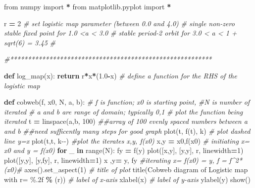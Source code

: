 \documentclass[
  a4paper,
  oneside,
  final]{krantz}
\newenvironment{Shaded}{\begin{snugshade}}{\end{snugshade}}
\newcommand{\BuiltInTok}[1]{#1}
\newcommand{\CommentTok}[1]{\textcolor[rgb]{0.56,0.35,0.01}{\textit{#1}}}
\newcommand{\ControlFlowTok}[1]{\textcolor[rgb]{0.13,0.29,0.53}{\textbf{#1}}}
\newcommand{\DecValTok}[1]{\textcolor[rgb]{0.00,0.00,0.81}{#1}}
\newcommand{\FloatTok}[1]{\textcolor[rgb]{0.00,0.00,0.81}{#1}}
\newcommand{\ImportTok}[1]{#1}
\newcommand{\KeywordTok}[1]{\textcolor[rgb]{0.13,0.29,0.53}{\textbf{#1}}}
\newcommand{\NormalTok}[1]{#1}
\newcommand{\OperatorTok}[1]{\textcolor[rgb]{0.81,0.36,0.00}{\textbf{#1}}}
\newcommand{\SpecialCharTok}[1]{\textcolor[rgb]{0.00,0.00,0.00}{#1}}
\newcommand{\StringTok}[1]{\textcolor[rgb]{0.31,0.60,0.02}{#1}}
\theoremstyle{definition}
\theoremstyle{definition}
\theoremstyle{definition}
\theoremstyle{definition}
\theoremstyle{remark}
\begin{document}
\begin{Shaded}
\begin{Highlighting}[]

\ImportTok{from}\NormalTok{ numpy }\ImportTok{import} \OperatorTok{*}
\ImportTok{from}\NormalTok{ matplotlib.pyplot }\ImportTok{import} \OperatorTok{*}

\NormalTok{r }\OperatorTok{=} \DecValTok{2} 
\CommentTok{\# set logistic map parameter (between 0.0 and 4.0)}
\CommentTok{\# single non{-}zero stable fixed point for 1.0 \textless{}a \textless{} 3.0}
\CommentTok{\# stable period{-}2 orbit for 3.0 \textless{} a \textless{} 1 + sqrt(6) = 3.45 }
\CommentTok{\#}

\CommentTok{\#*********************************************************}

\KeywordTok{def}\NormalTok{ log\_map(x):}
    \ControlFlowTok{return}\NormalTok{ r}\OperatorTok{*}\NormalTok{x}\OperatorTok{*}\NormalTok{(}\FloatTok{1.0}\OperatorTok{{-}}\NormalTok{x) }
\CommentTok{\# define a function for the RHS of the logistic map}


\KeywordTok{def}\NormalTok{ cobweb(f, x0, N, a, b):}
\CommentTok{\# f is function; x0 is starting point, }
\CommentTok{\#N is number of iterated}
\CommentTok{\# a and b are range of domain; typically 0,1 }
\CommentTok{\# plot the function being iterated}
\NormalTok{  t }\OperatorTok{=}\NormalTok{ linspace(a,b, }\DecValTok{100}\NormalTok{)  }
\CommentTok{\#\#array of 100 evenly spaced numbers between a and b}
\CommentTok{\#\#need sufficently many steps for good graph}
\NormalTok{  plot(t, f(t), }\StringTok{\textquotesingle{}k\textquotesingle{}}\NormalTok{)}
  \CommentTok{\# plot dashed line y=x}
\NormalTok{  plot(t,t, }\StringTok{\textquotesingle{}k{-}{-}\textquotesingle{}}\NormalTok{)}
  \CommentTok{\#plot the iterates x,y, f(x0)}
\NormalTok{  x,y }\OperatorTok{=}\NormalTok{ x0,f(x0) }\CommentTok{\# initiating x= x0 and y = f(x0)}
  \ControlFlowTok{for}\NormalTok{ \_ }\KeywordTok{in} \BuiltInTok{range}\NormalTok{(N):}
\NormalTok{    fy }\OperatorTok{=}\NormalTok{ f(y)}
\NormalTok{    plot([x,y], [y,y], }\StringTok{\textquotesingle{}r\textquotesingle{}}\NormalTok{, linewidth}\OperatorTok{=}\DecValTok{1}\NormalTok{)}
\NormalTok{    plot([y,y], [y,fy], }\StringTok{\textquotesingle{}r\textquotesingle{}}\NormalTok{, linewidth}\OperatorTok{=}\DecValTok{1}\NormalTok{)}
\NormalTok{    x ,y}\OperatorTok{=}\NormalTok{ y, fy }\CommentTok{\#iterating x= f(x0) = y, f = f\^{}2*(x0)\#}
\NormalTok{  axes().set\_aspect(}\DecValTok{1}\NormalTok{)}
  \CommentTok{\# title of plot}
\NormalTok{  title(}\StringTok{\textquotesingle{}Cobweb diagram of Logistic map with r= }\SpecialCharTok{\%.2f}\StringTok{\textquotesingle{}} \OperatorTok{\%}\NormalTok{ (r))  }
  \CommentTok{\# label of x{-}axis}
\NormalTok{  xlabel(}\StringTok{\textquotesingle{}x\textquotesingle{}}\NormalTok{)                                }
  \CommentTok{\# label of y{-}axis}
\NormalTok{  ylabel(}\StringTok{\textquotesingle{}y\textquotesingle{}}\NormalTok{)                                }
\NormalTok{  show()}
\end{Highlighting}
\end{Shaded}
\end{document}
